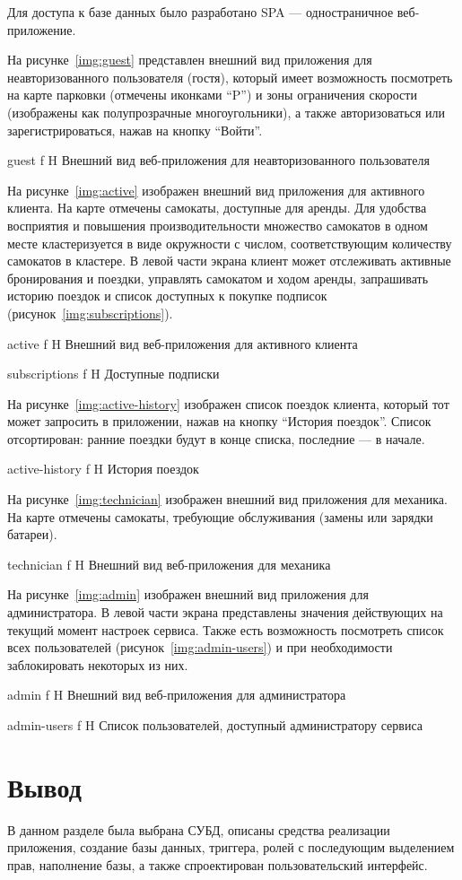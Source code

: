 Для доступа к базе данных было разработано SPA --- одностраничное веб-приложение.

На рисунке~\ref{img:guest} представлен внешний вид приложения для неавторизованного пользователя (гостя), который имеет возможность посмотреть на карте парковки (отмечены иконками \enquote{P}) и зоны ограничения скорости (изображены как полупрозрачные многоугольники), а также авторизоваться или зарегистрироваться, нажав на кнопку \enquote{Войти}.

{guest}
{f}
{H}
{\textwidth}
{Внешний вид веб-приложения для неавторизованного пользователя}

На рисунке~\ref{img:active} изображен внешний вид приложения для активного клиента. На карте отмечены самокаты, доступные для аренды. Для удобства восприятия и повышения производительности множество самокатов в одном месте кластеризуется в виде окружности с числом, соответствующим количеству самокатов в кластере. В левой части экрана клиент может отслеживать активные бронирования и поездки, управлять самокатом и ходом аренды, запрашивать историю поездок и список доступных к покупке подписок (рисунок~\ref{img:subscriptions}).

{active}
{f}
{H}
{\textwidth}
{Внешний вид веб-приложения для активного клиента}

{subscriptions}
{f}
{H}
{\textwidth}
{Доступные подписки}

На рисунке~\ref{img:active-history} изображен список поездок клиента, который тот может запросить в приложении, нажав на кнопку \enquote{История поездок}. Список отсортирован: ранние поездки будут в конце списка, последние --- в начале.

{active-history}
{f}
{H}
{\textwidth}
{История поездок}

На рисунке~\ref{img:technician} изображен внешний вид приложения для механика. На карте отмечены самокаты, требующие обслуживания (замены или зарядки батареи).

{technician}
{f}
{H}
{\textwidth}
{Внешний вид веб-приложения для механика}

На рисунке~\ref{img:admin} изображен внешний вид приложения для администратора. В левой части экрана представлены значения действующих на текущий момент настроек сервиса. Также есть возможность посмотреть список всех пользователей (рисунок~\ref{img:admin-users}) и при необходимости заблокировать некоторых из них.

{admin}
{f}
{H}
{\textwidth}
{Внешний вид веб-приложения для администратора}

{admin-users}
{f}
{H}
{\textwidth}
{Список пользователей, доступный администратору сервиса}

\section*{Вывод}

В данном разделе была выбрана СУБД, описаны средства реализации приложения, создание базы данных, триггера, ролей с последующим выделением прав, наполнение базы, а также спроектирован пользовательский интерфейс.